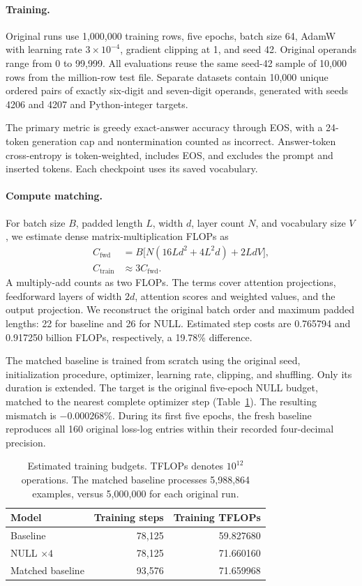 \documentclass[10pt,twocolumn,letterpaper]{article}
\begin{document}
\paragraph{Training.}
Original runs use 1,000,000 training rows, five epochs, batch size 64, AdamW
with learning rate $3\times10^{-4}$, gradient clipping at 1, and seed 42.
Original operands range from 0 to 99,999. All evaluations reuse the same
seed-42 sample of 10,000 rows from the million-row test file. Separate datasets
contain 10,000 unique ordered pairs of exactly six-digit and seven-digit
operands, generated with seeds 4206 and 4207 and Python-integer targets.

The primary metric is greedy exact-answer accuracy through EOS, with a
24-token generation cap and nontermination counted as incorrect. Answer-token
cross-entropy is token-weighted, includes EOS, and excludes the prompt and
inserted tokens. Each checkpoint uses its saved vocabulary.

\paragraph{Compute matching.}
For batch size $B$, padded length $L$, width $d$, layer count $N$, and vocabulary
size $V$, we estimate dense matrix-multiplication FLOPs as
\begin{align}
C_{\mathrm{fwd}} &= B\bigl[N(16Ld^2+4L^2d)+2LdV\bigr],\label{eq:flops}\\
C_{\mathrm{train}} &\approx 3C_{\mathrm{fwd}}.\nonumber
\end{align}
A multiply-add counts as two FLOPs. The terms cover attention projections,
feedforward layers of width $2d$, attention scores and weighted values, and
the output projection. We reconstruct the original batch order and maximum
padded lengths: 22 for baseline and 26 for NULL. Estimated step costs are
0.765794 and 0.917250 billion FLOPs, respectively, a 19.78\% difference.

The matched baseline is trained from scratch using the original seed,
initialization procedure, optimizer, learning rate, clipping, and shuffling.
Only its duration is extended. The target is the original five-epoch NULL
budget, matched to the nearest complete optimizer step (Table~\ref{tab:budget}).
The resulting mismatch is $-0.000268\%$. During its first five epochs, the
fresh baseline reproduces all 160 original loss-log entries within their
recorded four-decimal precision.

\begin{table}[t]
\centering\small
\setlength{\tabcolsep}{5pt}
\begin{tabular}{lrr}
\toprule
Model & Training steps & Training TFLOPs\\
\midrule
Baseline & 78,125 & 59.827680\\
NULL $\times4$ & 78,125 & 71.660160\\
Matched baseline & 93,576 & 71.659968\\
\bottomrule
\end{tabular}
\caption{Estimated training budgets. TFLOPs denotes $10^{12}$ operations.
The matched baseline processes 5,988,864 examples, versus 5,000,000 for each
original run.}\label{tab:budget}
\end{table}
\end{document}

